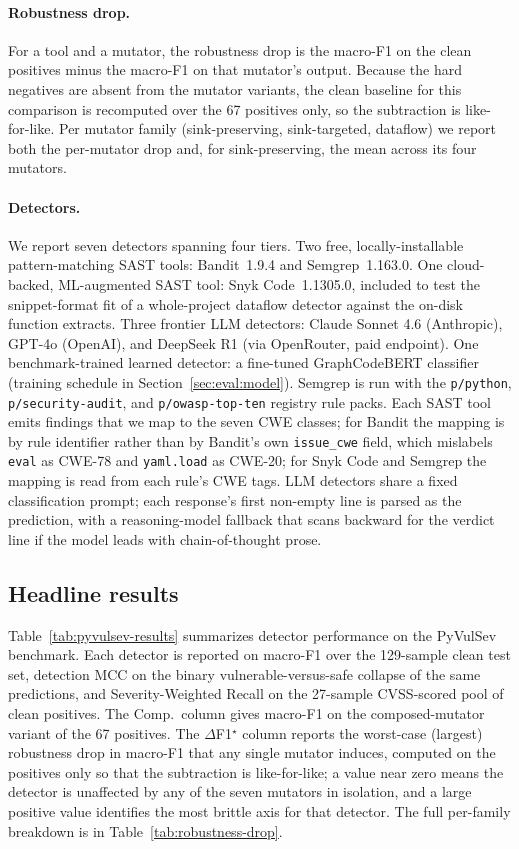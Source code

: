 \paragraph{Robustness drop.} For a tool and a mutator, the robustness
drop is the macro-F1 on the clean positives minus the macro-F1 on that
mutator's output. Because the hard negatives are absent from the
mutator variants, the clean baseline for this comparison is recomputed
over the 67 positives only, so the subtraction is like-for-like. Per
mutator family (sink-preserving, sink-targeted, dataflow) we report
both the per-mutator drop and, for sink-preserving, the mean across
its four mutators.

\paragraph{Detectors.} We report seven detectors spanning four tiers.
Two free, locally-installable pattern-matching SAST tools: Bandit~1.9.4
and Semgrep~1.163.0. One cloud-backed, ML-augmented SAST tool: Snyk
Code~1.1305.0, included to test the snippet-format fit of a
whole-project dataflow detector against the on-disk function extracts.
Three frontier LLM detectors: Claude Sonnet 4.6 (Anthropic), GPT-4o
(OpenAI), and DeepSeek R1 (via OpenRouter, paid endpoint). One
benchmark-trained learned detector: a fine-tuned GraphCodeBERT
classifier (training schedule in Section~\ref{sec:eval:model}). Semgrep
is run with the \texttt{p/python}, \texttt{p/security-audit}, and
\texttt{p/owasp-top-ten} registry rule packs. Each SAST tool emits
findings that we map to the seven CWE classes; for Bandit the mapping
is by rule identifier rather than by Bandit's own \texttt{issue\_cwe}
field, which mislabels \texttt{eval} as CWE-78 and \texttt{yaml.load}
as CWE-20; for Snyk Code and Semgrep the mapping is read from each
rule's CWE tags. LLM detectors share a fixed classification prompt;
each response's first non-empty line is parsed as the prediction, with
a reasoning-model fallback that scans backward for the verdict line if
the model leads with chain-of-thought prose.

\subsection{Headline results}
\label{sec:eval:headline}

Table~\ref{tab:pyvulsev-results} summarizes detector performance on the
PyVulSev benchmark. Each detector is reported on macro-F1 over the
129-sample clean test set, detection MCC on the binary
vulnerable-versus-safe collapse of the same predictions, and
Severity-Weighted Recall on the 27-sample CVSS-scored pool of clean
positives. The Comp.\ column gives macro-F1 on the composed-mutator
variant of the 67 positives. The $\Delta$F1$^{\star}$ column reports
the worst-case (largest) robustness drop in macro-F1 that any single
mutator induces, computed on the positives only so that the
subtraction is like-for-like; a value near zero means the detector is
unaffected by any of the seven mutators in isolation, and a large
positive value identifies the most brittle axis for that detector. The full per-family breakdown is in
Table~\ref{tab:robustness-drop}.

